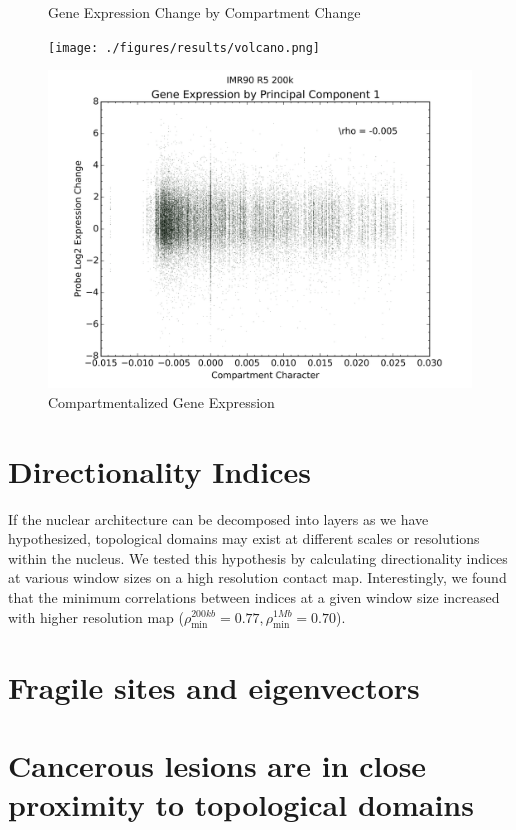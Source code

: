\begin{figure}[thp]
  \begin{minipage}{0.5\textwidth}%
    \centering
    \caption{Gene Expression Change by Compartment Change}\label{fig:expressionChangeByCompartmentChange}
    \texttt{[image: ./figures/results/volcano.png]}
  \end{minipage}
  \begin{minipage}{0.5\textwidth}
    \centering
    \caption{Compartmentalized Gene Expression}\label{fig:expressionChangeByCompartment}
    \includegraphics[width=\textwidth]{./figures/results/compartment-expression-IMR90-R5-200k.png}
  \end{minipage}
\end{figure}

\section*{Directionality Indices}

If the nuclear architecture can be decomposed into layers as we have hypothesized, topological domains may exist at different
scales or resolutions within the nucleus.  We tested this hypothesis by calculating directionality indices at various window sizes
on a high resolution contact map.  Interestingly, we found that the minimum correlations between indices at a given window size increased with
higher resolution map ($\rho_{\min}^{200kb} = 0.77, \rho_{\min}^{1Mb} = 0.70$).  %


\section*{Fragile sites and eigenvectors}

\section*{Cancerous lesions are in close proximity to topological domains}
